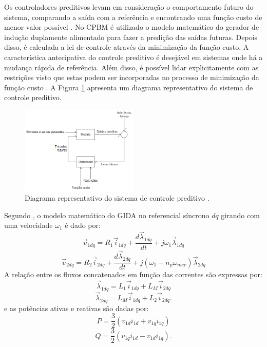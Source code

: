 	Os controladores preditivos levam em consideração o comportamento futuro do sistema, comparando a saída com a referência e encontrando uma função custo de menor valor possível \cite{camachoteoriapreditivomodelo,rositierteoriapreditivomodelo}. No CPBM é utilizado o modelo matemático do gerador de indução duplamente alimentado para fazer a predição das saídas futuras. Depois disso, é calculada a lei de controle através da minimização da função custo. A característica antecipativa do controle preditivo é desejável em sistemas onde há a mudança rápida de referência. Além disso, é possível lidar explicitamente com as restrições visto que estas podem ser incorporadas no processo de minimização da função custo \cite{alfeu}. A Figura \ref{figura:preditivo_esquema} apresenta um diagrama representativo do sistema de controle preditivo.
	\begin{figure}[h]
		\centering
		\includegraphics[width=0.5\textwidth]{Figuras/preditivo_esquematico.png}
		\caption{Diagrama representativo do sistema de controle preditivo \cite{alfeu}.}
		\label{figura:preditivo_esquema}
	\end{figure}

	Segundo , o modelo matemático do GIDA no referencial síncrono $dq$ girando com uma velocidade $\omega_1$ é dado por: 
	\begin{equation} 
		\label{equacao:gida_ref_sinc_estator}
		\vec{v}_{1dq}=R_1\vec{i}_{1dq}+\frac{d\vec{\lambda}_{1dq}}{dt}+j\omega_1\vec{\lambda}_{1dq}
	\end{equation}
	\begin{equation}
		\label{equacao_gida_ref_sinc_rotor}
		\vec{v}_{2dq}=R_2\vec{i}_{2dq}+\frac{d\vec{\lambda}_{2dq}}{dt}+j(\omega_1-n_p{\omega_{mec}})\vec{\lambda}_{2dq}
	\end{equation}
	A relação entre os fluxos concatenados em função das correntes são expressas por:
	\begin{equation}
		\label{equacao:gida_fluxo_estator}
		\vec{\lambda}_{1dq}=L_1\vec{i}_{1dq}+L_M\vec{i}_{2dq}
	\end{equation}
	\begin{equation}
		\label{equacao:gida_fluxo_rotor}
		\vec{\lambda}_{2dq}=L_M\vec{i}_{1dq}+L_2\vec{i}_{2dq}.
	\end{equation}
	e as potências ativas e reativas são dadas por:
	\begin{equation}
		\label{equacao:gida_potencia}
		P=\frac{3}{2}(v_{1d}i_{1d}+v_{1q}i_{1q})
	\end{equation}
	\begin{equation}
		\label{equacao:gida_reativo}
		Q=\frac{3}{2}(v_{1q}i_{1d}-v_{1d}i_{1q}).
	\end{equation}
	
